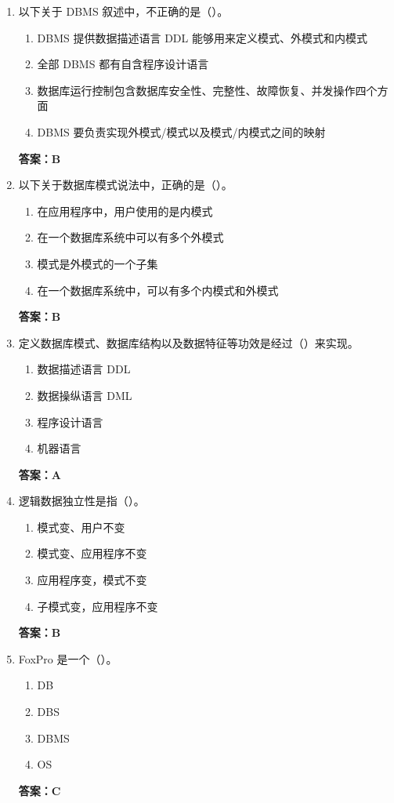 \documentclass[12pt, a4paper]{article}
\begin{document}
\begin{enumerate}[label=\arabic*.]
	\item 以下关于 DBMS 叙述中，不正确的是（\quad）。
	      \begin{enumerate}
		      \item DBMS 提供数据描述语言 DDL 能够用来定义模式、外模式和内模式
		      \item 全部 DBMS 都有自含程序设计语言
		      \item 数据库运行控制包含数据库安全性、完整性、故障恢复、并发操作四个方面
		      \item DBMS 要负责实现外模式/模式以及模式/内模式之间的映射
	      \end{enumerate}
	      \textbf{答案：B}

	\item 以下关于数据库模式说法中，正确的是（\quad）。
	      \begin{enumerate}
		      \item 在应用程序中，用户使用的是内模式
		      \item 在一个数据库系统中可以有多个外模式
		      \item 模式是外模式的一个子集
		      \item 在一个数据库系统中，可以有多个内模式和外模式
	      \end{enumerate}
	      \textbf{答案：B}

	\item 定义数据库模式、数据库结构以及数据特征等功效是经过（\quad）来实现。
	      \begin{enumerate}
		      \item 数据描述语言 DDL
		      \item 数据操纵语言 DML
		      \item 程序设计语言
		      \item 机器语言
	      \end{enumerate}
	      \textbf{答案：A}

	\item 逻辑数据独立性是指（\quad）。
	      \begin{enumerate}
		      \item 模式变、用户不变
		      \item 模式变、应用程序不变
		      \item 应用程序变，模式不变
		      \item 子模式变，应用程序不变
	      \end{enumerate}
	      \textbf{答案：B}

	\item FoxPro 是一个（\quad）。
	      \begin{enumerate}
		      \item DB
		      \item DBS
		      \item DBMS
		      \item OS
	      \end{enumerate}
	      \textbf{答案：C}


\end{enumerate}
\end{document}

